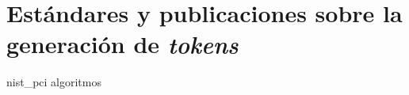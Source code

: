 %
%
%

\chapter{Estándares y publicaciones sobre la generación de \textit{tokens}}
\label{sec:generacion_de_tokens}

{nist_pci}
{algoritmos}
